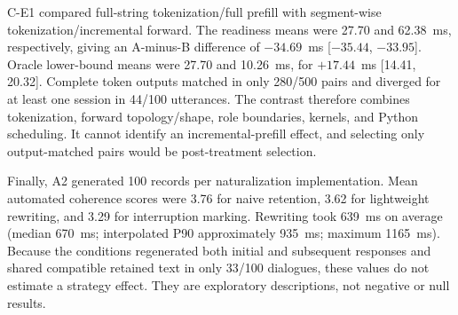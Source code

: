 C-E1 compared full-string tokenization/full prefill with segment-wise tokenization/incremental forward. The readiness means were 27.70 and 62.38~ms, respectively, giving an A-minus-B difference of $-34.69$~ms [$-35.44$, $-33.95$]. Oracle lower-bound means were 27.70 and 10.26~ms, for $+17.44$~ms [14.41, 20.32]. Complete token outputs matched in only 280/500 pairs and diverged for at least one session in 44/100 utterances. The contrast therefore combines tokenization, forward topology/shape, role boundaries, kernels, and Python scheduling. It cannot identify an incremental-prefill effect, and selecting only output-matched pairs would be post-treatment selection.

Finally, A2 generated 100 records per naturalization implementation. Mean automated coherence scores were 3.76 for naive retention, 3.62 for lightweight rewriting, and 3.29 for interruption marking. Rewriting took 639~ms on average (median 670~ms; interpolated P90 approximately 935~ms; maximum 1165~ms). Because the conditions regenerated both initial and subsequent responses and shared compatible retained text in only 33/100 dialogues, these values do not estimate a strategy effect. They are exploratory descriptions, not negative or null results.
